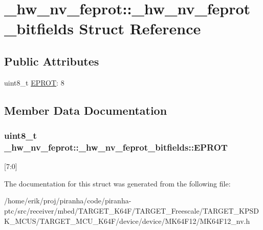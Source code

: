 \hypertarget{struct__hw__nv__feprot_1_1__hw__nv__feprot__bitfields}{}\section{\+\_\+hw\+\_\+nv\+\_\+feprot\+:\+:\+\_\+hw\+\_\+nv\+\_\+feprot\+\_\+bitfields Struct Reference}
\label{struct__hw__nv__feprot_1_1__hw__nv__feprot__bitfields}
\subsection*{Public Attributes}
\begin{DoxyCompactItemize}
\item 
uint8\+\_\+t \hyperlink{struct__hw__nv__feprot_1_1__hw__nv__feprot__bitfields_ab4012ab64a5626e7aaeab2b36871e863}{E\+P\+R\+OT}\+: 8
\end{DoxyCompactItemize}


\subsection{Member Data Documentation}
\subsubsection[{\texorpdfstring{E\+P\+R\+OT}{EPROT}}]{\setlength{\rightskip}{0pt plus 5cm}uint8\+\_\+t \+\_\+hw\+\_\+nv\+\_\+feprot\+::\+\_\+hw\+\_\+nv\+\_\+feprot\+\_\+bitfields\+::\+E\+P\+R\+OT}\hypertarget{struct__hw__nv__feprot_1_1__hw__nv__feprot__bitfields_ab4012ab64a5626e7aaeab2b36871e863}{}\label{struct__hw__nv__feprot_1_1__hw__nv__feprot__bitfields_ab4012ab64a5626e7aaeab2b36871e863}
\mbox{[}7\+:0\mbox{]} 

The documentation for this struct was generated from the following file\+:\begin{DoxyCompactItemize}
\item 
/home/erik/proj/piranha/code/piranha-\/ptc/src/receiver/mbed/\+T\+A\+R\+G\+E\+T\+\_\+\+K64\+F/\+T\+A\+R\+G\+E\+T\+\_\+\+Freescale/\+T\+A\+R\+G\+E\+T\+\_\+\+K\+P\+S\+D\+K\+\_\+\+M\+C\+U\+S/\+T\+A\+R\+G\+E\+T\+\_\+\+M\+C\+U\+\_\+\+K64\+F/device/device/\+M\+K64\+F12/M\+K64\+F12\+\_\+nv.\+h\end{DoxyCompactItemize}
